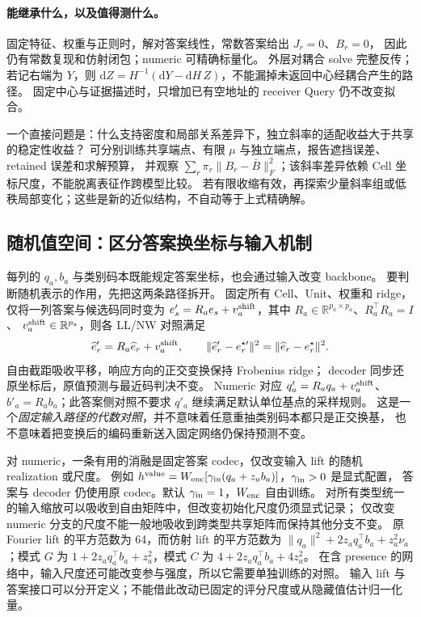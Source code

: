 \documentclass[11pt,UTF8,fontset=fandol]{ctexart}
\numberwithin{equation}{section}
\theoremstyle{definition}
\newcommand{\R}{\mathbb R}
\begin{document}
\paragraph{能继承什么，以及值得测什么。}
固定特征、权重与正则时，解对答案线性，常数答案给出 $J_r=0$、$B_r=0$，
因此仍有常数复现和仿射闭包；numeric 可精确标量化。
外层对耦合 solve 完整反传；若记右端为 $Y$，则
$\mathrm dZ=H^{-1}(\mathrm dY-\mathrm dH\,Z)$，不能漏掉未返回中心经耦合产生的路径。
固定中心与证据描述时，只增加已有空地址的 receiver Query 仍不改变拟合。

一个直接问题是：什么支持密度和局部关系差异下，独立斜率的适配收益大于共享的稳定性收益？
可分别训练共享端点、有限 $\mu$ 与独立端点，报告遮挡误差、retained 误差和求解预算，
并观察 $\sum_r\pi_r\|B_r-\bar B\|_F^2$；该斜率差异依赖 Cell 坐标尺度，不能脱离表征作跨模型比较。
若有限收缩有效，再探索少量斜率组或低秩局部变化；这些是新的近似结构，不自动等于上式精确解。

\subsection{随机值空间：区分答案换坐标与输入机制}
\label{v53g:subsec:codec-sensitivity}
每列的 $q_a,b_a$ 与类别码本既能规定答案坐标，也会通过输入改变 backbone。
要判断随机表示的作用，先把这两条路径拆开。
固定所有 Cell、Unit、权重和 ridge，仅将一列答案与候选码同时变为
$e'_s=R_ae_s+v_a^{\rm shift}$，其中 $R_a\in\R^{p_a\times p_a}$、$R_a^\top R_a=I$、
$v_a^{\rm shift}\in\R^{p_a}$，则各 LL/NW 对照满足
\begin{equation}
 \widehat e'_r=R_a\widehat e_r+v_a^{\rm shift},\qquad
 \|\widehat e'_r-e_r^{\star\prime}\|^2
 =\|\widehat e_r-e_r^\star\|^2.
 \label{v53g:eq:answer-coordinate-equivariance}
\end{equation}
自由截距吸收平移，响应方向的正交变换保持 Frobenius ridge；
decoder 同步还原坐标后，原值预测与最近码判决不变。
Numeric 对应 $q'_a=R_aq_a+v_a^{\rm shift}$、$b'_a=R_ab_a$；此答案侧对照不要求 $q'_a$ 继续满足默认单位基点的采样规则。
这是一个\emph{固定输入路径的代数对照}，并不意味着任意重抽类别码本都只是正交换基，
也不意味着把变换后的编码重新送入固定网络仍保持预测不变。

对 numeric，一条有用的消融是固定答案 codec，仅改变输入 lift 的随机 realization 或尺度。
例如 $h^{\rm value}=W_{\rm enc}[\gamma_{\rm in}(q_a+z_ab_a)]$，$\gamma_{\rm in}>0$ 是显式配置，
答案与 decoder 仍使用原 codec。默认 $\gamma_{\rm in}=1$，$W_{\rm enc}$ 自由训练。
对所有类型统一的输入缩放可以吸收到自由矩阵中，但改变初始化尺度仍须显式记录；
仅改变 numeric 分支的尺度不能一般地吸收到跨类型共享矩阵而保持其他分支不变。
原 Fourier lift 的平方范数为 64，而仿射 lift 的平方范数为
$\|q_a\|^2+2z_aq_a^\top b_a+z_a^2\nu_a$；模式 $G$ 为
$1+2z_aq_a^\top b_a+z_a^2$，模式 $C$ 为 $4+2z_aq_a^\top b_a+4z_a^2$。
在含 presence 的网络中，输入尺度还可能改变参与强度，所以它需要单独训练的对照。
输入 lift 与答案接口可以分开定义；不能借此改动已固定的评分尺度或从隐藏值估计归一化量。
\end{document}
